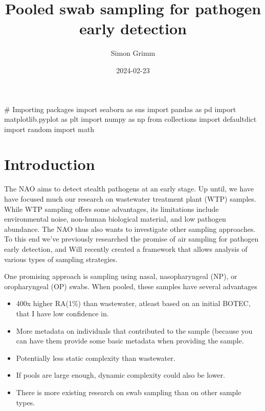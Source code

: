 \documentclass[
  letterpaper,
  DIV=11,
  numbers=noendperiod]{scrartcl}
\title{Pooled swab sampling for pathogen early detection}
\author{Simon Grimm}
\date{2024-02-23}
\newenvironment{Shaded}{\begin{snugshade}}{\end{snugshade}}
\newcommand{\CommentTok}[1]{\textcolor[rgb]{0.37,0.37,0.37}{#1}}
\newcommand{\ImportTok}[1]{\textcolor[rgb]{0.00,0.46,0.62}{#1}}
\newcommand{\NormalTok}[1]{\textcolor[rgb]{0.00,0.23,0.31}{#1}}
\providecommand{\tightlist}{%
  \setlength{\itemsep}{0pt}\setlength{\parskip}{0pt}}\usepackage{longtable,booktabs,array}
\begin{document}
\maketitle

\begin{Shaded}
\begin{Highlighting}[]
\CommentTok{\# Importing packages}
\ImportTok{import}\NormalTok{ seaborn }\ImportTok{as}\NormalTok{ sns}
\ImportTok{import}\NormalTok{ pandas }\ImportTok{as}\NormalTok{ pd}
\ImportTok{import}\NormalTok{ matplotlib.pyplot }\ImportTok{as}\NormalTok{ plt}
\ImportTok{import}\NormalTok{ numpy }\ImportTok{as}\NormalTok{ np}
\ImportTok{from}\NormalTok{ collections }\ImportTok{import}\NormalTok{ defaultdict}
\ImportTok{import}\NormalTok{ random}
\ImportTok{import}\NormalTok{ math}
\end{Highlighting}
\end{Shaded}

\section{Introduction}\label{introduction}

The NAO aims to detect stealth pathogens at an early stage. Up until, we
have have focused much our research on wastewater treatment plant (WTP)
samples. While WTP sampling offers some advantages, its limitations
include environmental noise, non-human biological material, and low
pathogen abundance. The NAO thus also wants to investigate other
sampling approaches. To this end we've previously researched the promise
of air sampling for pathogen early detection, and Will recently created
a framework that allows analysis of various types of sampling
strategies.

One promising approach is sampling using nasal, nasopharyngeal (NP), or
oropharyngeal (OP) swabs. When pooled, these samples have several
advantages

\begin{itemize}
\tightlist
\item
  400x higher RA(1\%) than wastewater, atleast based on an initial
  BOTEC, that I have low confidence in.
\item
  More metadata on individuals that contributed to the sample (because
  you can have them provide some basic metadata when providing the
  sample.
\item
  Potentially less static complexity than wastewater.
\item
  If pools are large enough, dynamic complexity could also be lower.
\item
  There is more existing research on swab sampling than on other sample
  types.
\end{itemize}
\end{document}
